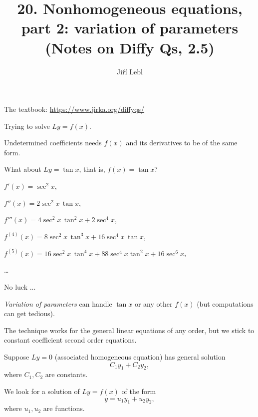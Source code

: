 \documentclass[10pt,aspectratio=169]{beamer}
\author{Ji\v{r}\'i Lebl}
\institute[OSU]{%
Oklahoma State University%
}
\title{20. Nonhomogeneous equations,\\part 2: variation of parameters\\(Notes on Diffy Qs, 2.5)}
\date{}
\begin{document}
\begin{frame}
\titlepage


\begin{center}
The textbook: \url{https://www.jirka.org/diffyqs/}
\end{center}
\end{frame}

\begin{frame}
Trying to solve $Ly = f(x)$.

\medskip

Undetermined coefficients needs $f(x)$ and its derivatives
to be of the same form.

\medskip
\pause

What about $Ly = \tan x$, that is, $f(x) = \tan x$?

\medskip
\pause

$f'(x) = \sec^2 x$,

\pause
$f''(x) = 2\sec^2 x \, \tan x$,

\pause
$f'''(x) = 4 \sec^2 x \, \tan^2 x + 2 \sec^4 x$,

\pause
$f^{(4)}(x) = 8 \sec^2 x \, \tan^3 x + 16 \sec^4 x \, \tan x$,

\pause
$f^{(5)}(x) = 16\sec^2 x \, \tan^4 x + 88 \sec^4 x \tan^2 x + 16 \sec^6 x$,

\ldots

\medskip
\pause

No luck ...

\end{frame}

\begin{frame}
\emph{Variation of parameters} can handle $\tan x$ or any other $f(x)$ (but
computations can get tedious).

\medskip
\pause

The technique works for the general linear equations of any order,
but we stick to constant coefficient second order equations.

\medskip
\pause

Suppose $Ly= 0$ (associated homogeneous equation) has general
solution
\[
C_1 y_1 + C_2 y_2 ,
\]
where $C_1,C_2$ are constants.

\medskip
\pause

We look for a solution of $Ly=f(x)$ of the form
\[
y  = u_1 y_1 + u_2 y_2 ,
\]
where $u_1,u_2$ are functions.

\end{frame}
\end{document}
